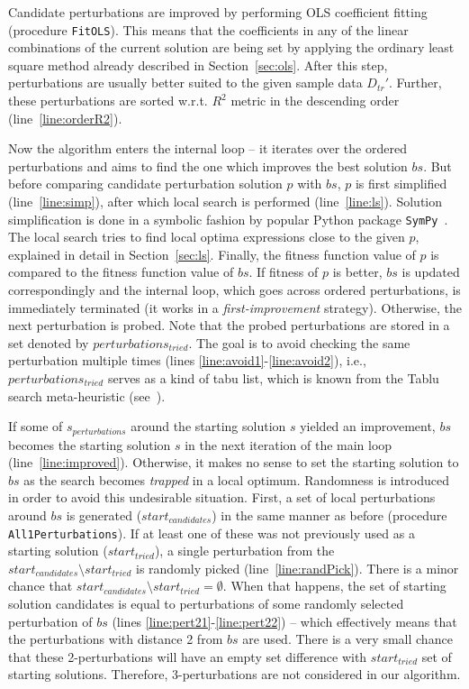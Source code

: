 \documentclass{bmcart}
\begin{document}
Candidate perturbations are improved by performing OLS coefficient fitting (procedure \texttt{FitOLS}). This means that the coefficients in any of the linear combinations of the current solution are being set by applying the ordinary least square method already described in Section~\ref{sec:ols}. 
After this step, perturbations are usually better suited to the given sample data $D_{tr}'$. 
Further, these perturbations are sorted w.r.t. $R^2$ metric in the descending order (line~\ref{line:orderR2}). 

Now the algorithm enters the internal loop -- it iterates over the ordered perturbations and aims to find the one which improves the best solution $bs$. But before comparing candidate perturbation solution $p$ with $bs$, $p$ is first simplified (line~\ref{line:simp}), after which local search is performed (line~\ref{line:ls}).
Solution simplification is done in a symbolic fashion by popular  Python package \texttt{SymPy}~\cite{sympy}.
The local search tries to find local optima expressions close to the given $p$, explained in detail in Section~\ref{sec:ls}.  
Finally, the fitness function value of $p$ is compared to the fitness function value of $bs$. If fitness of $p$ is better, $bs$ is updated correspondingly and the internal loop, which goes across ordered perturbations, is immediately terminated (it works in a  \emph{first-improvement} strategy). Otherwise, the next perturbation is probed. 
Note that the probed perturbations are stored in a set denoted by $perturbations_{tried}$. The goal is to avoid checking the same perturbation multiple times (lines \ref{line:avoid1}-\ref{line:avoid2}), i.e., $perturbations_{tried}$ serves as a kind of tabu list, which is known from the Tablu search meta-heuristic (see~\cite{glover1998tabu}).    


If some of $s_{perturbations}$ around the starting solution $s$ yielded an improvement, $bs$ becomes the starting solution $s$ in the next iteration of the main loop (line~\ref{line:improved}). 
Otherwise, it makes no sense to set the starting solution to $bs$ as the search becomes  \emph{trapped} in a local optimum. Randomness is introduced in order to avoid this undesirable situation. First, a set of local perturbations around $bs$ is generated ($start_{candidates}$) in the same manner as before (procedure \texttt{All1Perturbations}). If at least one of these was not previously used as a starting solution ($start_{tried}$), a single perturbation from the $start_{candidates} \setminus start_{tried}$ is randomly picked (line~\ref{line:randPick}). There is a minor chance that $start_{candidates} \setminus start_{tried} = \emptyset$. When that happens, the set of starting solution candidates is equal to perturbations of some randomly selected perturbation of $bs$ (lines \ref{line:pert21}-\ref{line:pert22}) -- which effectively means that the perturbations with distance 2 from $bs$ are used. There is a very small chance that these 2-perturbations will have an empty set difference with $start_{tried}$ set of starting solutions. Therefore, 3-perturbations are not considered in our algorithm. 
\end{document}
